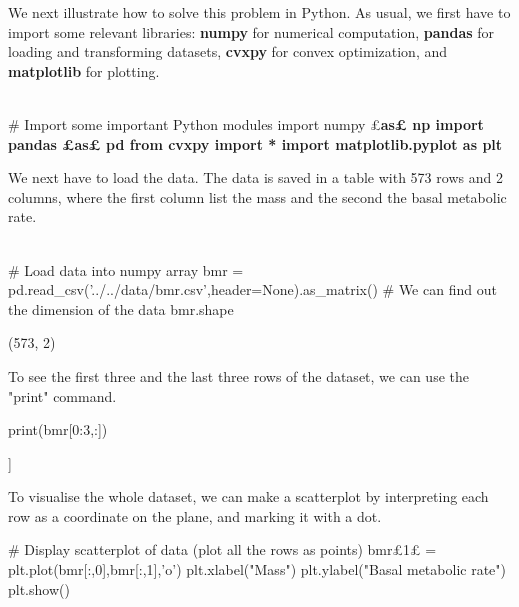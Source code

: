 \begin{example}
We next illustrate how to solve this problem in Python. As usual, we first have to import some relevant libraries: \textbf{numpy} for numerical computation, \textbf{pandas} for loading and transforming datasets, \textbf{cvxpy} for convex optimization, and \textbf{matplotlib} for plotting.

\begin{ipythonnb}
\\# Import some important Python modules
import numpy £\bfseries\color{kwgreen}as£ np
import pandas £\bfseries\color{kwgreen}as£ pd
from cvxpy import *
import matplotlib.pyplot as plt
\end{ipythonnb}

We next have to load the data. The data is saved in a table with 573 rows and 2 columns, where the first column list the mass and the second the basal metabolic rate.

\begin{ipythonnb}
\\# Load data into numpy array
bmr = pd.read_csv('../../data/bmr.csv',header=None).as_matrix()
# We can find out the dimension of the data
bmr.shape
\end{ipythonnb}
\begin{ipythonnbout}[2]
(573, 2)
\end{ipythonnbout}

To see the first three and the last three rows of the dataset, we can use the "print" command.

\begin{ipythonnb}[3]
print(bmr[0:3,:])
\end{ipythonnb}

\begin{ipythonnboutno}
[[ 13.108   10.604 ]
 [  9.3918   8.2158]
 [ 10.366    9.3285]]
\end{ipythonnboutno}

To visualise the whole dataset, we can make a scatterplot by interpreting each row as a coordinate on the plane, and marking it with a dot.

\begin{ipythonnb}[4]
# Display scatterplot of data (plot all the rows as points)
bmr£1£ = plt.plot(bmr[:,0],bmr[:,1],'o')
plt.xlabel("Mass")
plt.ylabel("Basal metabolic rate")
plt.show()
\end{ipythonnb}


\end{example}
